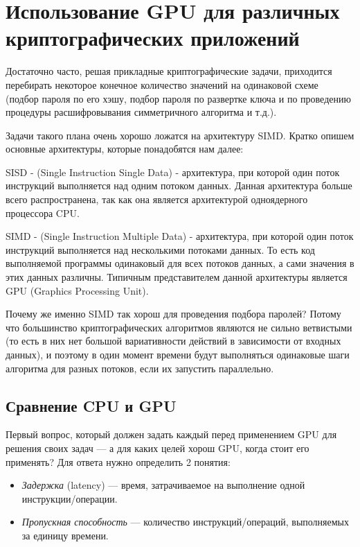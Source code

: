 \documentclass[12pt,a4paper]{scrartcl}
\begin{document}
\section{Использование GPU для различных криптографических приложений}

Достаточно часто, решая прикладные криптографические задачи, приходится перебирать некоторое конечное количество значений на одинаковой схеме (подбор пароля по его хэшу, подбор пароля по развертке ключа и по проведению процедуры расшифровывания симметричного алгоритма и т.д.).

Задачи такого плана очень хорошо ложатся на архитектуру SIMD. 
Кратко опишем основные архитектуры, которые понадобятся нам далее:

SISD - (Single Instruction Single Data) - архитектура, при которой один поток инструкций выполняется над одним потоком данных. Данная архитектура больше всего распространена, так как она является архитектурой одноядерного процессора CPU.

SIMD - (Single Instruction Multiple Data) - архитектура, при которой один поток инструкций выполняется над несколькими потоками данных. То есть код выполняемой программы одинаковый для всех потоков данных, а сами значения в этих данных различны. Типичным представителем данной архитектуры является GPU (Graphics Processing Unit).

Почему же именно SIMD так хорош для проведения подбора паролей? Потому что большинство криптографических алгоритмов являются не сильно ветвистыми (то есть в них нет большой вариативности действий в зависимости от входных данных), и поэтому в один момент времени будут выполняться одинаковые шаги алгоритма для разных потоков, если их запустить параллельно. 

\subsection{Сравнение CPU и GPU}


Первый вопрос, который должен задать каждый перед применением GPU для решения своих задач — а для каких целей хорош GPU, когда стоит его применять? Для ответа нужно определить 2 понятия:

\begin{itemize}
	\item \textit{Задержка} (latency) — время, затрачиваемое на выполнение одной инструкции/операции.
	\item \textit{Пропускная способность} — количество инструкций/операций, выполняемых за единицу времени.
\end{itemize}
\end{document}
